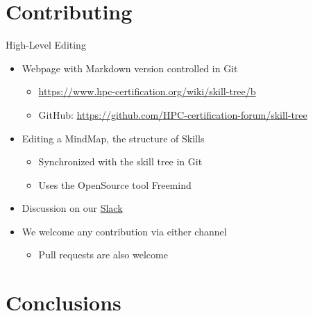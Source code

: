 \documentclass[compress,aspectratio=169]{beamer}
\begin{document}
\section{Contributing}

\begin{frame}{High-Level Editing}
  \begin{itemize}
    \item Webpage with Markdown version controlled in Git
      \begin{itemize}
        \item \url{https://www.hpc-certification.org/wiki/skill-tree/b}
        \item GitHub: \url{https://github.com/HPC-certification-forum/skill-tree}
      \end{itemize}
    \item Editing a MindMap, the structure of Skills
      \begin{itemize}
        \item Synchronized with the skill tree in Git
        \item Uses the OpenSource tool Freemind
      \end{itemize}
    \item Discussion on our \href{https://join.slack.com/t/hpc-certification/shared_invite/enQtMzUwNzU3NzM2MTkzLTAzZWM3NDg0N2I2ZmQwOWI5ZGUwNjNlNDgzM2RmOTM3ZWRjNjIxYTc5NzUxYTJhNmRlNmM5YmE1NDY3YzkzYzA}{Slack}
    \item We welcome any contribution via either channel
      \begin{itemize}
        \item Pull requests are also welcome
      \end{itemize}
  \end{itemize}
\end{frame}



\section{Conclusions}
\sectionIntroHidden
\end{document}
